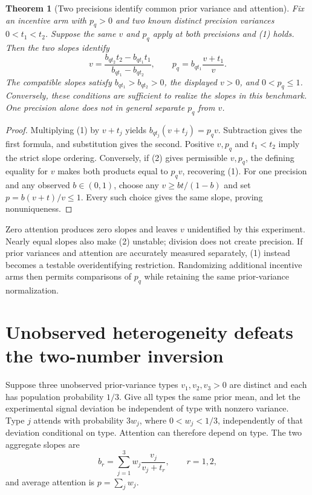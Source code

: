 \documentclass[11pt]{article}
\newtheorem{theorem}{Theorem}
\theoremstyle{definition}
\begin{document}
\begin{theorem}[Two precisions identify common prior variance and attention]
Fix an incentive arm with $p_q>0$ and two known distinct precision variances $0<t_1<t_2$. Suppose the same $v$ and $p_q$ apply at both precisions and (1) holds. Then the two slopes identify
\[
 v=\frac{b_{qt_2}t_2-b_{qt_1}t_1}{b_{qt_1}-b_{qt_2}},
 \qquad
 p_q=b_{qt_1}\frac{v+t_1}{v}.
 \tag{2}
\]
The compatible slopes satisfy $b_{qt_1}>b_{qt_2}>0$, the displayed $v>0$, and $0<p_q\le1$. Conversely, these conditions are sufficient to realize the slopes in this benchmark. One precision alone does not in general separate $p_q$ from $v$.
\end{theorem}
\begin{proof}
Multiplying (1) by $v+t_j$ yields $b_{qt_j}(v+t_j)=p_qv$. Subtraction gives the first formula, and substitution gives the second. Positive $v,p_q$ and $t_1<t_2$ imply the strict slope ordering. Conversely, if (2) gives permissible $v,p_q$, the defining equality for $v$ makes both products equal to $p_qv$, recovering (1). For one precision and any observed $b\in(0,1)$, choose any $v\ge bt/(1-b)$ and set $p=b(v+t)/v\le1$. Every such choice gives the same slope, proving nonuniqueness.
\end{proof}
Zero attention produces zero slopes and leaves $v$ unidentified by this experiment. Nearly equal slopes also make (2) unstable; division does not create precision. If prior variances and attention are accurately measured separately, (1) instead becomes a testable overidentifying restriction. Randomizing additional incentive arms then permits comparisons of $p_q$ while retaining the same prior-variance normalization.

\section*{Unobserved heterogeneity defeats the two-number inversion}
Suppose three unobserved prior-variance types $v_1,v_2,v_3>0$ are distinct and each has population probability $1/3$. Give all types the same prior mean, and let the experimental signal deviation be independent of type with nonzero variance. Type $j$ attends with probability $3w_j$, where $0<w_j<1/3$, independently of that deviation conditional on type. Attention can therefore depend on type. The two aggregate slopes are
\[
 b_r=\sum_{j=1}^3 w_j\frac{v_j}{v_j+t_r},\qquad r=1,2,
\]
and average attention is $p=\sum_jw_j$.
\end{document}

